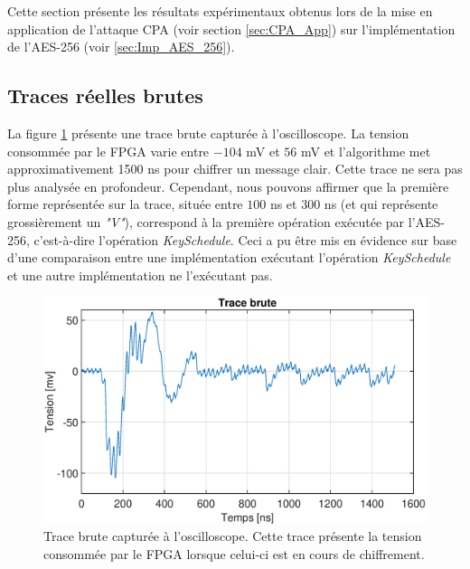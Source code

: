 \documentclass[oneside]{book}
\begin{document}
Cette section présente les résultats expérimentaux obtenus lors de la mise en application de l'attaque CPA (voir section \ref{sec:CPA_App}) sur l'implémentation de l'AES-256 (voir \ref{sec:Imp_AES_256}).

\subsection{Traces réelles brutes}
\label{sec:real_trace}

La figure \ref{fig:trace_brute} présente une trace brute capturée à l'oscilloscope. La tension consommée par le FPGA varie entre $-104$ \si{\milli\volt} et $56$ \si{\milli\volt} et l'algorithme met approximativement 1500 \si{\nano\second} pour chiffrer un message clair. Cette trace ne sera pas plus analysée en profondeur. Cependant, nous pouvons affirmer que la première forme représentée sur la trace, située entre $100$ \si{\nano\second} et $300$ \si{\nano\second} (et qui représente grossièrement un \textit{"V"}),  correspond à la première opération exécutée par l'AES-256, c'est-à-dire l'opération \textit{KeySchedule}. Ceci a pu être mis en évidence sur base d'une comparaison entre une implémentation exécutant l'opération \textit{KeySchedule} et une autre implémentation ne l'exécutant pas.

\begin{figure}[htbp]
    \hspace{-2cm}
    \includegraphics[scale=0.6]{image/trace_brute}
    \caption{Trace brute capturée à l'oscilloscope. Cette trace présente la tension consommée par le FPGA lorsque celui-ci est en cours de chiffrement.}
    \label{fig:trace_brute} 
\end{figure}
\end{document}
